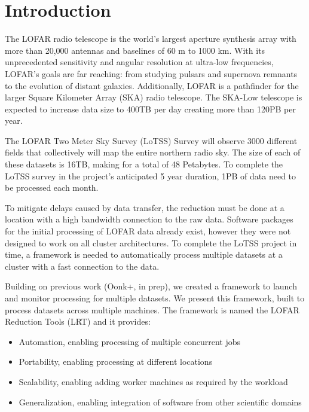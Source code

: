 % 
\setcounter{footnote}{0}

\section{Introduction}
The LOFAR radio telescope is the world's largest aperture synthesis array with more than 20,000 antennas and baselines of 60 m to 1000 km\cite{van2013lofar}. With its unprecedented sensitivity and angular resolution at ultra-low frequencies, LOFAR's goals are far reaching: from studying pulsars and supernova remnants to the evolution of distant galaxies. Additionally, LOFAR is a pathfinder for the larger Square Kilometer Array (SKA) radio telescope. The SKA-Low telescope is expected to increase data size\cite{lofar_data} to 400TB per day creating more than 120PB per year\cite{ska_cloud_memo}. 

The LOFAR Two Meter Sky Survey (LoTSS) Survey\cite{lotss} will observe 3000 different fields that collectively will map the entire northern radio sky. The size of each of these datasets is 16TB, making for a total of 48 Petabytes. To complete the LoTSS survey in the project's anticipated 5 year duration, 1PB of data need to be processed each month. 

To mitigate delays caused by data transfer, the reduction must be done at a location with a high bandwidth connection to the raw data. Software packages for the initial processing of LOFAR data already exist\cite{van2016lofar}, however they were not designed to work on all cluster architectures. To complete the LoTSS project in time, a framework is needed to automatically process multiple datasets at a cluster with a fast connection to the data. 

Building on previous work (Oonk+, in prep), we created a framework to launch and monitor processing for multiple datasets. We present this framework, built to process datasets across multiple machines. The framework is named the LOFAR Reduction Tools (LRT) and it provides:

\begin{itemize}[noitemsep,topsep=0pt]
 \item Automation, enabling processing of multiple concurrent jobs
 \item Portability, enabling processing at different locations 
 \item Scalability, enabling adding worker machines as required by the workload
 \item Generalization, enabling integration of software from other scientific domains
\end{itemize}

